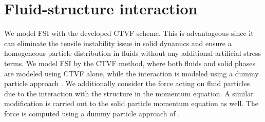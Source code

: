 \chapter{Fluid-structure interaction}
\label{sec:fsi}
We model FSI with the developed CTVF scheme. This is advantageous since it can
eliminate the tensile instability issue in solid dynamics and ensure a homogeneous
particle distribution in fluids without any additional artificial stress terms.
We model FSI by the CTVF method, where both fluids and solid phases are modeled
using CTVF alone, while the interaction is modeled using a dummy particle
approach \citep{Adami2012}. We additionally consider the force acting on fluid
particles due to the interaction with the structure in the momentum equation. A
similar modification is carried out to the solid particle momentum equation as
well. The force is computed using a dummy particle approach of
\textcite{Adami2012}.


